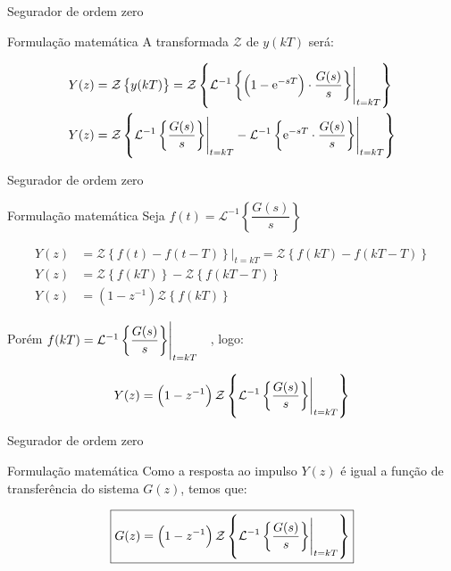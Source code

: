 \begin{frame}{Segurador de ordem zero}
\begin{block}{Formulação matemática}
A transformada $\mathcal{Z}$ de $ y(kT) $ será:

\begin{align*}
	Y(z)&=\mathcal{Z}\left\lbrace y(kT) \right\rbrace=\mathcal{Z}\left\lbrace \eval{\mathcal{L}^{-1}\left\lbrace \left( 1-\text{e}^{-sT}\right) \cdot \dfrac{G(s)}{s} \right\rbrace}_{t=kT} \right\rbrace\\
	Y(z)&=\mathcal{Z}\left\lbrace\eval{\mathcal{L}^{-1}\left\lbrace \dfrac{G(s)}{s} \right\rbrace}_{t=kT}-\eval{\mathcal{L}^{-1}\left\lbrace\text{e}^{-sT}\cdot \dfrac{G(s)}{s} \right\rbrace}_{t=kT} \right\rbrace
\end{align*}
\end{block}
\end{frame}


\begin{frame}{Segurador de ordem zero}
\begin{block}{Formulação matemática}
Seja $ f(t)=\mathcal{L}^{-1}\left\lbrace \dfrac{G(s)}{s}\right\rbrace  $

\begin{align*}
Y(z)&=\mathcal{Z}\left\lbrace f(t)-f(t-T)\right\rbrace\Big|_{t=kT}=\mathcal{Z}\left\lbrace f(kT)-f(kT-T)\right\rbrace\\
Y(z)&=\mathcal{Z}\left\lbrace f(kT)\right\rbrace -\mathcal{Z}\left\lbrace f(kT-T)\right\rbrace\\
Y(z)&=\left( 1-z^{-1}\right) \mathcal{Z}\left\lbrace f(kT)\right\rbrace
\end{align*}

Porém $ f(kT)=\eval{\mathcal{L}^{-1}\left\lbrace \dfrac{G(s)}{s}\right\rbrace}_{t=kT} \quad $, logo:

\[ Y(z)=\left( 1-z^{-1}\right) \mathcal{Z}\left\lbrace \eval{\mathcal{L}^{-1}\left\lbrace \dfrac{G(s)}{s} \right\rbrace}_{t=kT}\right\rbrace \]
\end{block}
\end{frame}


\begin{frame}{Segurador de ordem zero}
\begin{block}{Formulação matemática}
	Como a resposta ao impulso $ Y(z) $ é igual a função de transferência do sistema $ G(z)$, temos que:
	
	\[ \boxed{G(z)=\left( 1-z^{-1}\right) \mathcal{Z}\left\lbrace \eval{\mathcal{L}^{-1}\left\lbrace \dfrac{G(s)}{s} \right\rbrace}_{t=kT}\right\rbrace} \]
\end{block}
\end{frame}


